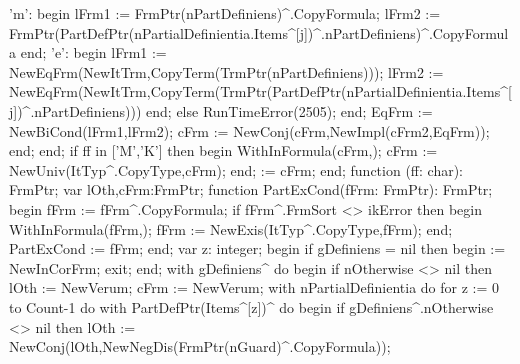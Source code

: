                'm':
                  begin
                     lFrm1 := FrmPtr(nPartDefiniens)^.CopyFormula;
                     lFrm2 := FrmPtr(PartDefPtr(nPartialDefinientia.Items^[j])^.nPartDefiniens)^.CopyFormula
                  end;
               'e':
                  begin
                     lFrm1 := NewEqFrm(NewItTrm,CopyTerm(TrmPtr(nPartDefiniens)));
                     lFrm2 := NewEqFrm(NewItTrm,CopyTerm(TrmPtr(PartDefPtr(nPartialDefinientia.Items^[j])^.nPartDefiniens)))
                  end;
               else RunTimeError(2505);
            end;
            EqFrm := NewBiCond(lFrm1,lFrm2);
            cFrm := NewConj(cFrm,NewImpl(cFrm2,EqFrm));
         end;
      end;
   if ff in ['M','K'] then
   begin
      WithInFormula(cFrm,);
      cFrm := NewUniv(ItTyp^.CopyType,cFrm);
   end;
    := cFrm;
end;
\eatline
{}\nwendcode{}\nwdocspar
\nwenddocs{}\endmoddef\nwstartdeflinemarkup{}\nwenddeflinemarkup
function (ff: char): FrmPtr;
var
   lOth,cFrm:FrmPtr;
   function PartExCond(fFrm: FrmPtr): FrmPtr;
   begin
      fFrm := fFrm^.CopyFormula;
      if fFrm^.FrmSort <> ikError then
      begin
         WithInFormula(fFrm,);
         fFrm := NewExis(ItTyp^.CopyType,fFrm);
      end;
      PartExCond := fFrm;
   end;
var
   z: integer;
begin
   if gDefiniens = nil then
   begin
       := NewInCorFrm; exit;
   end;
   with gDefiniens^ do
   begin
      if nOtherwise <> nil then lOth := NewVerum;
      cFrm := NewVerum;
      with nPartialDefinientia do
         for z := 0 to Count-1 do
            with PartDefPtr(Items^[z])^ do
         begin
            if gDefiniens^.nOtherwise <> nil then
               lOth := NewConj(lOth,NewNegDis(FrmPtr(nGuard)^.CopyFormula));
